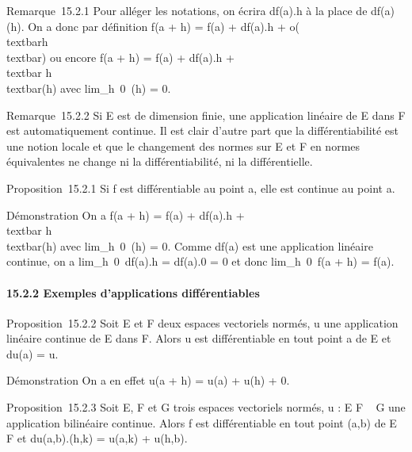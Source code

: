 \documentclass[]{article}
\begin{document}
Remarque~15.2.1 Pour alléger les notations, on écrira df(a).h à la place
de \big {[}df(a)\big {]}(h). On a donc par
définition f(a + h) = f(a) + df(a).h +
o(\\textbar{}h\\textbar{}) ou encore f(a +
h) = f(a) + df(a).h +\\textbar{}
h\\textbar{}\epsilon(h) avec
lim\_h\rightarrow~0~\epsilon(h) = 0.

Remarque~15.2.2 Si E est de dimension finie, une application linéaire de
E dans F est automatiquement continue. Il est clair d'autre part que la
différentiabilité est une notion locale et que le changement des normes
sur E et F en normes équivalentes ne change ni la différentiabilité, ni
la différentielle.

Proposition~15.2.1 Si f est différentiable au point a, elle est continue
au point a.

Démonstration On a f(a + h) = f(a) + df(a).h +\\textbar{}
h\\textbar{}\epsilon(h) avec
lim\_h\rightarrow~0~\epsilon(h) = 0. Comme df(a) est une
application linéaire continue, on a
lim\_h\rightarrow~0~df(a).h = df(a).0 = 0 et donc
lim\_h\rightarrow~0~f(a + h) = f(a).

\paragraph{15.2.2 Exemples d'applications différentiables}

Proposition~15.2.2 Soit E et F deux espaces vectoriels normés, u une
application linéaire continue de E dans F. Alors u est différentiable en
tout point a de E et du(a) = u.

Démonstration On a en effet u(a + h) = u(a) + u(h) + 0.

Proposition~15.2.3 Soit E, F et G trois espaces vectoriels normés, u : E
\times F \rightarrow~ G une application bilinéaire continue. Alors f est différentiable
en tout point (a,b) de E \times F et du(a,b).(h,k) = u(a,k) + u(h,b).
\end{document}
